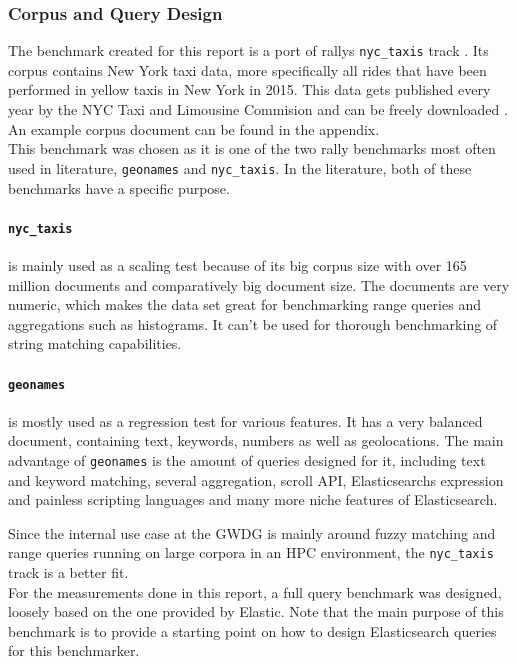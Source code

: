 \subsubsection{Corpus and Query Design}
The benchmark created for this report is a port of rallys \texttt{nyc\_taxis} track \cite{nyctaxis}. Its corpus contains New York taxi data, more specifically all rides that have been performed in yellow taxis in New York in 2015. This data gets published every year by the NYC Taxi and Limousine Commision and can be freely downloaded \cite{tlcdata}. An example corpus document can be found in the appendix.\\

This benchmark was chosen as it is one of the two rally benchmarks most often used in literature, \texttt{geonames} and \texttt{nyc\_taxis}. In the literature, both of these benchmarks have a specific purpose. 

\paragraph{\texttt{nyc\_taxis}} is mainly used as a scaling test because of its big corpus size with over 165 million documents and comparatively big document size. The documents are very numeric, which makes the data set great for benchmarking range queries and aggregations such as histograms. It can't be used for thorough benchmarking of string matching capabilities.

\paragraph{\texttt{geonames}} is mostly used as a regression test for various features. It has a very balanced document, containing text, keywords, numbers as well as geolocations. The main advantage of \texttt{geonames} is the amount of queries designed for it, including text and keyword matching, several aggregation, scroll API, Elasticsearchs expression and painless scripting languages and many more niche features of Elasticsearch.

Since the internal use case at the GWDG is mainly around fuzzy matching and range queries running on large corpora in an \ac{HPC} environment, the \texttt{nyc\_taxis} track is a better fit.\\


For the measurements done in this report, a full query benchmark was designed, loosely based on the one provided by Elastic. Note that the main purpose of this benchmark is to provide a starting point on how to design Elasticsearch queries for this benchmarker. 

